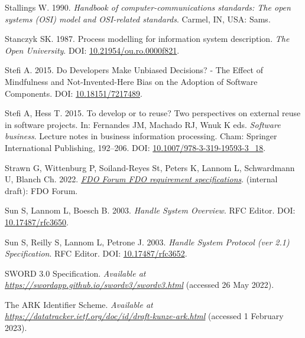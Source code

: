 \begin{CSLReferences}{1}{0}
\leavevmode{}%
Stallings W. 1990. \emph{Handbook of computer-communications standards: The open systems (OSI) model and OSI-related standards}. Carmel, IN, USA: Sams.

\leavevmode{}%
Stanczyk SK. 1987. Process modelling for information system description. \emph{The Open University}. DOI: \href{https://doi.org/10.21954/ou.ro.0000f821}{10.21954/ou.ro.0000f821}.

\leavevmode{}%
Stefi A. 2015. Do Developers Make Unbiased Decisions? - The Effect of Mindfulness and Not-Invented-Here Bias on the Adoption of Software Components. DOI: \href{https://doi.org/10.18151/7217489}{10.18151/7217489}.

\leavevmode{}%
Stefi A, Hess T. 2015. To develop or to reuse? Two perspectives on external reuse in software projects. In: Fernandes JM, Machado RJ, Wnuk K eds. \emph{Software business}. Lecture notes in business information processing. Cham: Springer International Publishing, 192--206. DOI: \href{https://doi.org/10.1007/978-3-319-19593-3_18}{10.1007/978-3-319-19593-3\_18}.

\leavevmode{}%
Strawn G, Wittenburg P, Soiland-Reyes St, Peters K, Lannom L, Schwardmann U, Blanch Ch. 2022. \emph{\href{https://docs.google.com/document/d/1aGA-TBr4XpORhMPtnf_--Nb4FYJccgeSvGmGh68jNws/edit}{FDO Forum FDO requirement specifications}}. (internal draft): FDO Forum.

\leavevmode{}%
Sun S, Lannom L, Boesch B. 2003. \emph{Handle System Overview}. RFC Editor. DOI: \href{https://doi.org/10.17487/rfc3650}{10.17487/rfc3650}.

\leavevmode{}%
Sun S, Reilly S, Lannom L, Petrone J. 2003. \emph{Handle System Protocol (ver 2.1) Specification}. RFC Editor. DOI: \href{https://doi.org/10.17487/rfc3652}{10.17487/rfc3652}.

\leavevmode{}%
SWORD 3.0 Specification. \emph{Available at} \href{https://swordapp.github.io/swordv3/swordv3.html}{\emph{https://swordapp.github.io/swordv3/swordv3.html}} (accessed 26 May 2022).

\leavevmode{}%
The ARK Identifier Scheme. \emph{Available at} \href{https://datatracker.ietf.org/doc/id/draft-kunze-ark.html}{\emph{https://datatracker.ietf.org/doc/id/draft-kunze-ark.html}} (accessed 1 February 2023).


\end{CSLReferences}
